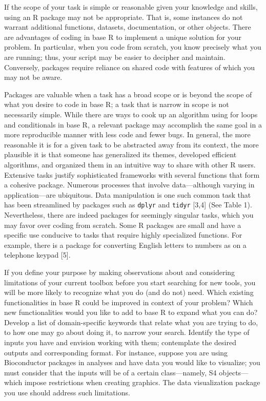 \documentclass[10pt,letterpaper]{article}
\begin{document}
If the scope of your task is simple or reasonable given your knowledge
and skills, using an R package may not be appropriate. That is, some
instances do not warrant additional functions, datasets, documentation,
or other objects. There are advantages of coding in base R to implement
a unique solution for your problem. In particular, when you code from
scratch, you know precisely what you are running; thus, your script may
be easier to decipher and maintain. Conversely, packages require
reliance on shared code with features of which you may not be aware.

Packages are valuable when a task has a broad scope or is beyond the
scope of what you desire to code in base R; a task that is narrow in
scope is not necessarily simple. While there are ways to cook up an
algorithm using for loops and conditionals in base R, a relevant package
may accomplish the same goal in a more reproducible manner with less
code and fewer bugs. In general, the more reasonable it is for a given
task to be abstracted away from its context, the more plausible it is
that someone has generalized its themes, developed efficient algorithms,
and organized them in an intuitive way to share with other R users.
Extensive tasks justify sophisticated frameworks with several functions
that form a cohesive package. Numerous processes that involve
data---although varying in application---are ubiquitous. Data
manipulation is one such common task that has been streamlined by
packages such as \texttt{dplyr} and \texttt{tidyr} {[}3,4{]} (See Table
1). Nevertheless, there are indeed packages for seemingly singular
tasks, which you may favor over coding from scratch. Some R packages are
small and have a specific use conducive to tasks that require highly
specialized functions. For example, there is a package for converting
English letters to numbers as on a telephone keypad {[}5{]}.

If you define your purpose by making observations about and considering
limitations of your current toolbox before you start searching for new
tools, you will be more likely to recognize what you do (and do not)
need. Which existing functionalities in base R could be improved in
context of your problem? Which new functionalities would you like to add
to base R to expand what you can do? Develop a list of domain-specific
keywords that relate what you are trying to do, to how one may go about
doing it, to narrow your search. Identify the type of inputs you have
and envision working with them; contemplate the desired outputs and
corresponding format. For instance, suppose you are using Bioconductor
packages in analyses and have data you would like to visualize; you must
consider that the inputs will be of a certain class---namely, S4
objects---which impose restrictions when creating graphics. The data
visualization package you use should address such limitations.
\end{document}
